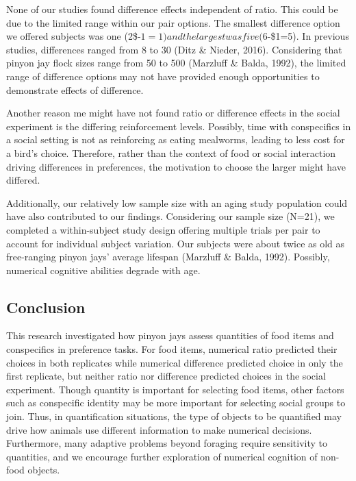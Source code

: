\documentclass[
  ,pub,floatsintext]{apa6}
\begin{document}
None of our studies found difference effects independent of ratio. This could be due to the limited range within our pair options. The smallest difference option we offered subjects was one (2\$-\(1=1) and the largest was five (6\)-\$1=5). In previous studies, differences ranged from 8 to 30 (Ditz \& Nieder, 2016). Considering that pinyon jay flock sizes range from 50 to 500 (Marzluff \& Balda, 1992), the limited range of difference options may not have provided enough opportunities to demonstrate effects of difference.

Another reason me might have not found ratio or difference effects in the social experiment is the differing reinforcement levels. Possibly, time with conspecifics in a social setting is not as reinforcing as eating mealworms, leading to less cost for a bird's choice. Therefore, rather than the context of food or social interaction driving differences in preferences, the motivation to choose the larger might have differed.

Additionally, our relatively low sample size with an aging study population could have also contributed to our findings. Considering our sample size (N=21), we completed a within-subject study design offering multiple trials per pair to account for individual subject variation. Our subjects were about twice as old as free-ranging pinyon jays' average lifespan (Marzluff \& Balda, 1992). Possibly, numerical cognitive abilities degrade with age.

\hypertarget{conclusion}{%
\subsection{Conclusion}\label{conclusion}}

This research investigated how pinyon jays assess quantities of food items and conspecifics in preference tasks. For food items, numerical ratio predicted their choices in both replicates while numerical difference predicted choice in only the first replicate, but neither ratio nor difference predicted choices in the social experiment. Though quantity is important for selecting food items, other factors such as conspecific identity may be more important for selecting social groups to join. Thus, in quantification situations, the type of objects to be quantified may drive how animals use different information to make numerical decisions. Furthermore, many adaptive problems beyond foraging require sensitivity to quantities, and we encourage further exploration of numerical cognition of non-food objects.
\end{document}
